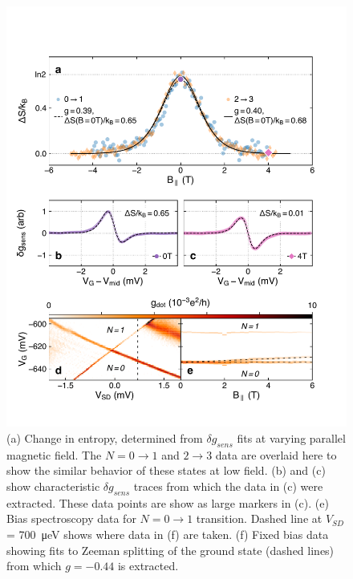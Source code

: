 \documentclass[twocolumn,showpacs,amsmath,amssymb,prl,aps,superscriptaddress]{revtex4-1}
\begin{document}
\begin{figure}
        \includegraphics[width=1.0\columnwidth]{../figures/figure_3.pdf}
        \caption{\label{fig:fig3}(a) Change in entropy, determined from $\delta g_{sens}$ fits at varying parallel magnetic field. The $N=0 \rightarrow 1$ and $2 \rightarrow 3$ data are overlaid here to show the similar behavior of these states at low field. (b) and (c) show characteristic $\delta g_{sens}$ traces from which the data in (c) were extracted. These data points are show as large markers in (c). (e) Bias spectroscopy data for $N=0 \rightarrow 1$ transition. Dashed line at $V_{SD}$ = \SI{700}{\micro\electronvolt} shows where data in (f) are taken. (f) Fixed bias data showing fits to Zeeman splitting of the ground state (dashed lines) from which $g = -0.44$ is extracted.}
\end{figure}
\end{document}
